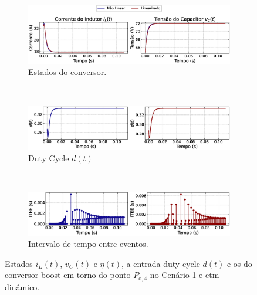 \begin{figure}[H]
  \centering
  \captionsetup{justification=centering}
  \begin{subfigure}{1.\textwidth}
    \centering
    \includegraphics[width=1.\textwidth]{figuras/dynamic-etm/boost/sim1/op2/result.eps}
    \caption{Estados do conversor.}
    \label{fig:boost_converter_constant_pcpl_dynamic_etm_op2_a}
  \end{subfigure}
  \\[6pt]
  \begin{subfigure}{1.\textwidth}
    \centering
    \includegraphics[width=1.\textwidth]{figuras/dynamic-etm/boost/sim1/op2/duty-cycle.eps}
    \caption{Duty Cycle $d(t)$}
    \label{fig:boost_converter_constant_pcpl_dynamic_etm_op2_b}
  \end{subfigure}
  \\[6pt]
  \begin{subfigure}{1.\textwidth}
    \centering
    \includegraphics[width=1.\textwidth]{figuras/dynamic-etm/boost/sim1/op2/inter-event-times.eps}
    \caption{Intervalo de tempo entre eventos.}
    \label{fig:boost_converter_constant_pcpl_dynamic_etm_op2_c}
  \end{subfigure}
  \caption{Estados $i_L(t)$, $v_C(t)$ e $\eta(t)$, a entrada duty cycle $d(t)$ e os  do conversor boost em torno do ponto $P_{\mathrm{o}, 4}$ no Cenário 1 e \acrshort{etm} dinâmico.}
  \label{fig:boost_converter_constant_pcpl_dynamic_etm_op2}
\end{figure}

